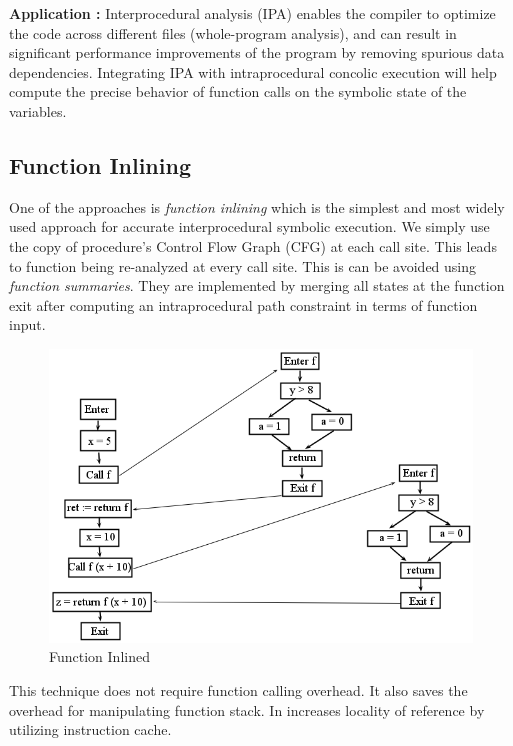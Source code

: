 \documentclass[12pt,oneside]{book}
\begin{document}
\textbf{Application :} Interprocedural analysis (IPA) enables the compiler to optimize the code across different files (whole-program analysis), and can result in significant performance improvements of the program by removing spurious data dependencies. Integrating IPA with intraprocedural concolic execution will help compute the precise behavior of function calls on the symbolic state of the variables.


\subsection {Function Inlining}
One of the approaches is \textit{function inlining}\cite{ipa1} which is the simplest and most widely used approach for accurate interprocedural symbolic execution. We simply use the copy of procedure's Control Flow Graph (CFG) at each call site. This leads to function being re-analyzed at every call site. This is can be avoided using \textit{function summaries}. They are implemented by merging all states at the function exit after computing an intraprocedural path constraint in terms of function input.\\ 

\begin{figure}[htbp]
\centering
\includegraphics[scale=0.5]{inlineCFG.png}
\caption{Function Inlined}
\end{figure}

This technique does not require function calling overhead. It also saves the overhead for manipulating function stack. In increases locality of reference by utilizing instruction cache.
\end{document}
